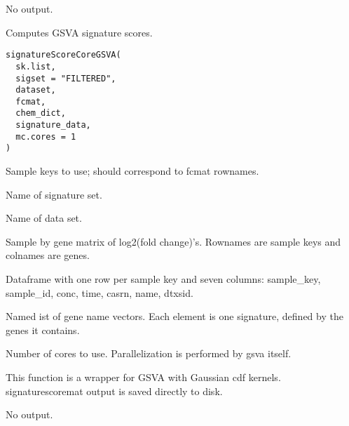 \documentclass[letterpaper]{book}
\begin{document}
%
\begin{Value}
No output.
\end{Value}
%
\begin{Description}\relax
Computes GSVA signature scores.
\end{Description}
%
\begin{Usage}
\begin{verbatim}
signatureScoreCoreGSVA(
  sk.list,
  sigset = "FILTERED",
  dataset,
  fcmat,
  chem_dict,
  signature_data,
  mc.cores = 1
)
\end{verbatim}
\end{Usage}
%
\begin{Arguments}
\begin{ldescription}
\item[\code{sk.list}] Sample keys to use; should correspond to fcmat rownames.

\item[\code{sigset}] Name of signature set.

\item[\code{dataset}] Name of data set.

\item[\code{fcmat}] Sample by gene matrix of log2(fold change)'s. Rownames are
sample keys and colnames are genes.

\item[\code{chem\_dict}] Dataframe with one row per sample key and seven columns:
sample\_key, sample\_id, conc, time, casrn, name, dtxsid.

\item[\code{signature\_data}] Named ist of gene name vectors. Each element is one
signature, defined by the genes it contains.

\item[\code{mc.cores}] Number of cores to use. Parallelization is performed
by gsva itself.
\end{ldescription}
\end{Arguments}
%
\begin{Details}\relax
This function is a wrapper for GSVA with Gaussian cdf kernels. signaturescoremat
output is saved directly to disk.
\end{Details}
%
\begin{Value}
No output.
\end{Value}
\end{document}
